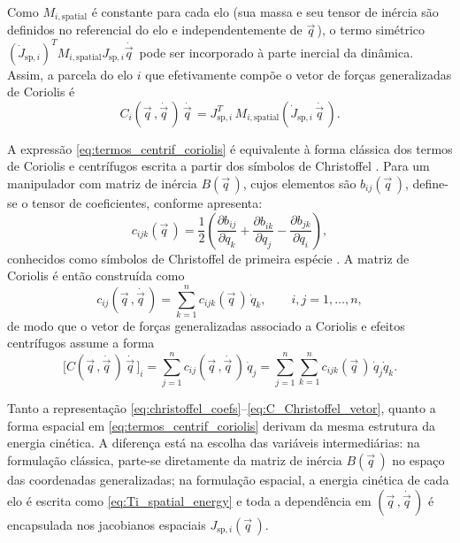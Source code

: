 Como $M_{i,\text{spatial}}$ é constante para cada elo (sua massa e seu tensor de
inércia são definidos no referencial do elo e independentemente de $\vec q\, $),
o termo simétrico
$(\dot J_{\text{sp},i})^{T}M_{i,\text{spatial}}J_{\text{sp},i}\dot{\vec q\, }$
pode ser incorporado à parte inercial da dinâmica.
Assim, a parcela do elo
$i$ que efetivamente compõe o vetor de forças generalizadas de Coriolis é
\begin{equation}
C_i(\vec q\, ,\dot{\vec q\, })\,\dot{\vec q\, }
=
J_{\text{sp},i}^{T}\,
M_{i,\text{spatial}}
\left(
\dot J_{\text{sp},i}\,\dot{\vec q\, }
\right).
\label{eq:termos_centrif_coriolis}
\end{equation}

A expressão \eqref{eq:termos_centrif_coriolis} é equivalente à forma
clássica dos termos de Coriolis e centrífugos escrita a partir dos símbolos de
Christoffel \cite{featherstone2008}.
Para um manipulador com matriz de inércia
$B(\vec q\, )$,
cujos elementos são $b_{ij}(\vec q\, )$,
define-se o tensor de coeficientes, conforme \cite{sciavicco_siciliano2010} apresenta:
\begin{equation}
c_{ijk}(\vec q\, )
=
\frac{1}{2}
\left(
\frac{\partial b_{ij}}{\partial q_k}
+
\frac{\partial b_{ik}}{\partial q_j}
-
\frac{\partial b_{jk}}{\partial q_i}
\right),
\label{eq:christoffel_coefs}
\end{equation}
conhecidos como símbolos de Christoffel de primeira espécie \cite{sciavicco_siciliano2010}.
A matriz de Coriolis é então construída como
\begin{equation}
c_{ij}(\vec q\, ,\dot{\vec q\, })
=
\sum_{k=1}^{n} c_{ijk}(\vec q\, )\,\dot q_k,
\qquad
i,j = 1,\dots,n,
\label{eq:C_Christoffel}
\end{equation}
de modo que o vetor de forças generalizadas associado a Coriolis e efeitos
centrífugos assume a forma
\begin{equation}
\bigl[C(\vec q\, ,\dot{\vec q\, })\,\dot{\vec q\, }\bigr]_i
=
\sum_{j=1}^{n} c_{ij}(\vec q\, ,\dot{\vec q\, })\,\dot q_j
=
\sum_{j=1}^{n}\sum_{k=1}^{n}
c_{ijk}(\vec q\, )\,\dot q_j \dot q_k.
\label{eq:C_Christoffel_vetor}
\end{equation}

Tanto a representação
\eqref{eq:christoffel_coefs}--\eqref{eq:C_Christoffel_vetor},
quanto a forma espacial em \eqref{eq:termos_centrif_coriolis} derivam da mesma
estrutura da energia cinética.
A diferença está na escolha das variáveis intermediárias:
na formulação clássica, parte-se diretamente da
matriz de inércia $B(\vec q\, )$ no espaço das coordenadas generalizadas;
na formulação espacial, a energia cinética de cada elo é escrita
como \eqref{eq:Ti_spatial_energy} e toda a dependência em
$(\vec q\, ,\dot{\vec q\, })$ é encapsulada nos jacobianos espaciais $J_{\text{sp},i}(\vec q\, )$.

